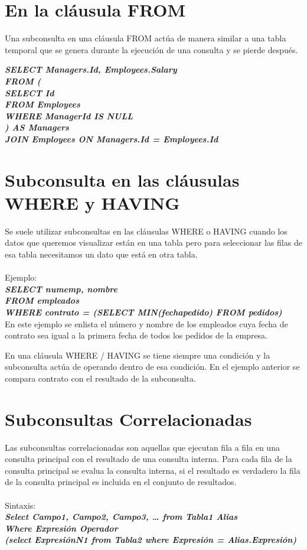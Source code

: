 \documentclass{article}
\begin{document}
\section{En la cláusula FROM}

Una subconsulta en una cláusula FROM actúa de manera similar a una tabla temporal que se genera durante la ejecución de una consulta y se pierde después. 


\begin{flushleft}
\textit{\textbf{SELECT Managers.Id, Employees.Salary\\
  FROM (\\
  SELECT Id\\
  FROM Employees\\
  WHERE ManagerId IS NULL\\
) AS Managers\\
JOIN Employees ON Managers.Id = Employees.Id}}
\end{flushleft}

\section{Subconsulta en las cláusulas WHERE y HAVING}
Se suele utilizar subconsultas en las cláusulas WHERE o HAVING cuando los datos que queremos visualizar están en una tabla pero para seleccionar las filas de esa tabla necesitamos un dato que está en otra tabla. \\ \\ Ejemplo:\\

\textit{\textbf{SELECT numemp, nombre\\
FROM empleados\\
WHERE contrato = (SELECT MIN(fechapedido) FROM pedidos)}}\\

En este ejemplo se enlista el número y nombre de los empleados cuya fecha de contrato sea igual a la primera fecha de todos los pedidos de la empresa.

En una cláusula WHERE / HAVING se tiene siempre una condición y la subconsulta actúa de operando dentro de esa condición.
En el ejemplo anterior se compara contrato con el resultado de la subconsulta. 

\section{Subconsultas Correlacionadas}
Las subconsultas correlacionadas son aquellas que ejecutan fila a fila en una consulta principal con el resultado de una consulta interna. Para cada fila de la consulta principal se evalua la consulta interna, si el resultado es verdadero la fila de la consulta principal es incluida en el conjunto de resultados. \\ \\Sintaxis:\\

\textit{\textbf{Select Campo1, Campo2, Campo3, … from Tabla1 Alias\\
Where Expresión Operador\\
(select ExpresiónN1 from Tabla2 where Expresión = Alias.Expresión)}}\\


\printbibliography
\end{document}
